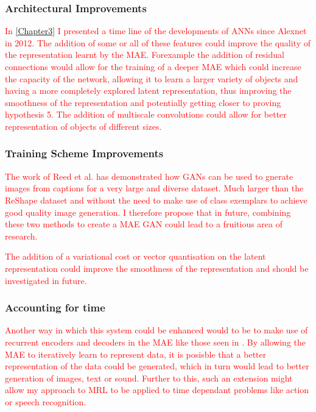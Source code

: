 \subsubsection{Architectural Improvements}
\textcolor{red}{In \autoref{Chapter3} I presented a time line of the developments of \acp{ANN} since Alexnet \cite{krizhevsky2012imagenet} in 2012. The addition of some or all of these features could improve the quality of the representation learnt by the \ac{MAE}. Forexample the addition of residual connections \cite{he2016deep} would allow for the training of a deeper \ac{MAE} which could increase the capacity of the network, allowing it to learn a larger variety of objects and having a more completely explored latent representation, thus improving the smoothness of the representation and potentially getting closer to proving hypothesis 5. The addition of multiscale convolutions \cite{szegedy2015going} could allow for better representation of objects of different sizes.}

\subsubsection{Training Scheme Improvements}
\textcolor{red}{The work of Reed et al. \cite{reed2016generative} has demonstrated how \acp{GAN} can be used to gnerate images from captions for a very large and diverse dataset. Much larger than the ReShape dataset and without the need to make use of class exemplars to achieve good quality image generation. I therefore propose that in future, combining these two methods to create a \ac{MAE} \ac{GAN} could lead to a fruitious area of research.}

\textcolor{red}{The addition of a variational cost \cite{kingma2013auto} or vector quantisation \cite{wavenet} on the latent representation could improve the smoothness of the representation and should be investigated in future.}


\subsubsection{Accounting for time}
\textcolor{red}{Another way in which this system could be enhanced would to be to make use of recurrent encoders and decoders in the \ac{MAE} like those seen in \cite{gregor2015draw}. By allowing the \ac{MAE} to iteratively learn to represent data, it is posisble that a better representation of the data could be generated, which in turn would lead to better generation of images, text or sound. Further to this, such an extension might allow my approach to \ac{MRL} to be applied to time dependant problems like action or speech recognition.}




